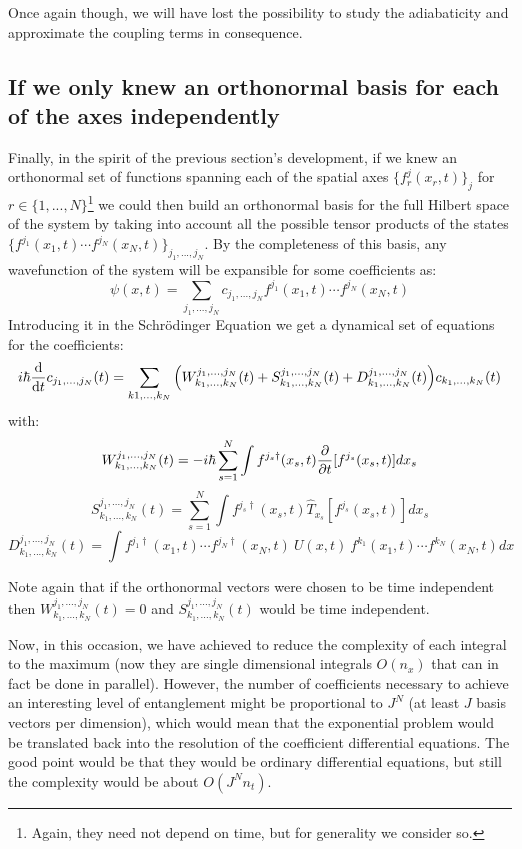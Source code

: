 \documentclass[11pt, a4paper]{article} %
\begin{document}
Once again though, we will have lost the possibility to study the adiabaticity and approximate the coupling terms in consequence.

\subsection{If we only knew an orthonormal basis for each of the axes independently}
Finally, in the spirit of the previous section's development, if we knew an orthonormal set of functions spanning each of the spatial axes $\{ f^j_r(x_r,t) \}_j$ for $r\in\{1,...,N \}$\footnote{Again, they need not depend on time, but for generality we consider so.} we could then build an orthonormal basis for the full Hilbert space of the system by taking into account all the possible tensor products of the states $\{f^{j_1}(x_1,t)\cdots f^{j_N}(x_N,t) \}_{j_1,...,j_N}$. By the completeness of this basis, any wavefunction of the system will be expansible for some coefficients as:
\begin{equation}
\psi(x,t)=\sum_{j_1,...,j_N} c_{j_1,...,j_N} f^{j_1}(x_1,t)\cdots f^{j_N}(x_N,t)
\end{equation}
Introducing it in the Schrödinger Equation we get a dynamical set of equations for the coefficients:
\begin{equation}
i\hbar \dv{}{t} c_{j_1,...,j_N}(t) = \sum_{k1,...,k_N} \qty(W^{j_1,...,j_N}_{k_1,...,k_N}(t)+S^{j_1,...,j_N}_{k_1,...,k_N}(t)+D^{j_1,...,j_N}_{k_1,...,k_N}(t))c_{k_1,...,k_N}(t)
\end{equation}
with:
\begin{equation}
W^{j_1,...,j_N}_{k_1,...,k_N}(t)=-i\hbar \sum_{s=1}^N \int f^{j_s\dagger}(x_s,t)\pdv{}{t}[f^{j_s}(x_s,t)]dx_s
\end{equation}
\begin{equation}
S^{j_1,...,j_N}_{k_1,...,k_N}(t)=\sum_{s=1}^N \int f^{j_s\dagger}(x_s,t)\hat{T}_{x_s}[f^{j_s}(x_s,t)]dx_s
\end{equation}
\begin{equation}
D^{j_1,...,j_N}_{k_1,...,k_N}(t)=\int f^{j_1\dagger}(x_1,t)\cdots f^{j_N\dagger}(x_N,t)\ U(x,t)\ f^{k_1}(x_1,t)\cdots f^{k_N}(x_N,t) dx
\end{equation}

Note again that if the orthonormal vectors were chosen to be time independent then $W^{j_1,...,j_N}_{k_1,...,k_N}(t)=0$ and $S^{j_1,...,j_N}_{k_1,...,k_N}(t)$ would be time independent. 

Now, in this occasion, we have achieved to reduce the complexity of each integral to the maximum (now they are single dimensional integrals $O(n_x)$ that can in fact be done in parallel). However, the number of coefficients necessary to achieve an interesting level of entanglement might be proportional to $J^N$ (at least $J$ basis vectors per dimension), which would mean that the exponential problem would be translated back into the resolution of the coefficient differential equations. The good point would be that they would be ordinary differential equations, but still the complexity would be about $O(J^Nn_t)$.
\end{document}
